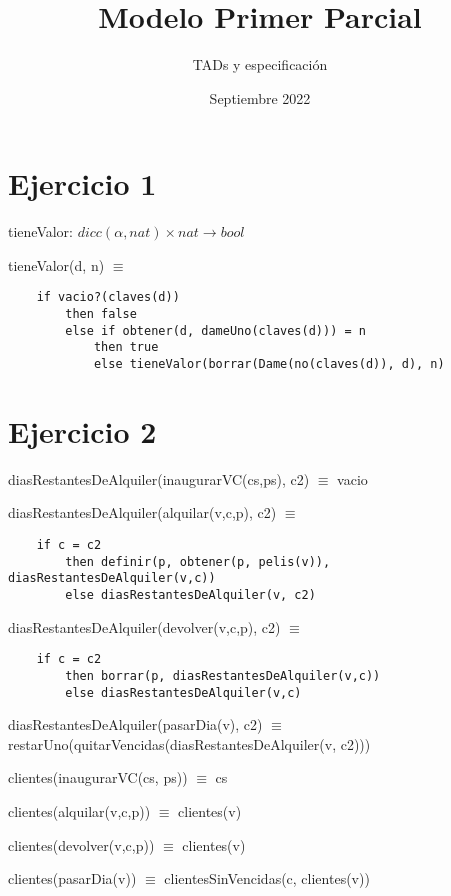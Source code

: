 
\setlength{\parindent}{0pt}

\title{Modelo Primer Parcial}
\author{TADs y especificación}
\date{Septiembre 2022}



\maketitle

\section{Ejercicio 1}

tieneValor: $dicc(\alpha, nat) \times nat \rightarrow bool$

tieneValor(d, n) $\equiv $
\begin{lstlisting}
    if vacio?(claves(d))
        then false
        else if obtener(d, dameUno(claves(d))) = n
            then true
            else tieneValor(borrar(Dame(no(claves(d)), d), n)
\end{lstlisting}
\section{Ejercicio 2}

diasRestantesDeAlquiler(inaugurarVC(cs,ps), c2) $\equiv$ vacio

diasRestantesDeAlquiler(alquilar(v,c,p), c2) $\equiv$ 
\begin{lstlisting}
    if c = c2
        then definir(p, obtener(p, pelis(v)), diasRestantesDeAlquiler(v,c))
        else diasRestantesDeAlquiler(v, c2)
\end{lstlisting}

diasRestantesDeAlquiler(devolver(v,c,p), c2) $\equiv$ 
\begin{lstlisting}
    if c = c2
        then borrar(p, diasRestantesDeAlquiler(v,c))
        else diasRestantesDeAlquiler(v,c)
\end{lstlisting}

diasRestantesDeAlquiler(pasarDia(v), c2) $\equiv$ restarUno(quitarVencidas(diasRestantesDeAlquiler(v, c2)))

clientes(inaugurarVC(cs, ps)) $\equiv$ cs

clientes(alquilar(v,c,p)) $\equiv$ clientes(v)

clientes(devolver(v,c,p)) $\equiv$ clientes(v)

clientes(pasarDia(v)) $\equiv$ clientesSinVencidas(c, clientes(v))

